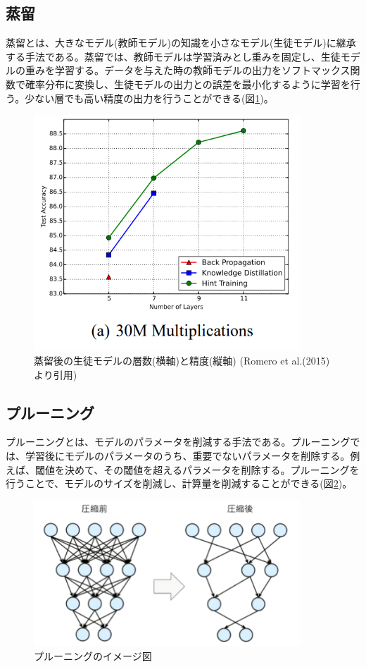 \documentclass{ltjsarticle}
\begin{document}
\subsection{蒸留}
蒸留とは、大きなモデル(教師モデル)の知識を小さなモデル(生徒モデル)に継承する手法である。蒸留では、教師モデルは学習済みとし重みを固定し、生徒モデルの重みを学習する。データを与えた時の教師モデルの出力をソフトマックス関数で確率分布に変換し、生徒モデルの出力との誤差を最小化するように学習を行う。少ない層でも高い精度の出力を行うことができる(図\ref{fig:distillation})。
\begin{figure}[htbp]
  \centering
  \includegraphics[width=10cm]{./capture/distillation.png}
  \caption{蒸留後の生徒モデルの層数(横軸)と精度(縦軸) (Romero et al.(2015) より引用)}
  \label{fig:distillation}
\end{figure}

\subsection{プルーニング}
プルーニングとは、モデルのパラメータを削減する手法である。プルーニングでは、学習後にモデルのパラメータのうち、重要でないパラメータを削除する。例えば、閾値を決めて、その閾値を超えるパラメータを削除する。プルーニングを行うことで、モデルのサイズを削減し、計算量を削減することができる(図\ref{fig:pruning})。
\begin{figure}[htbp]
  \centering
  \includegraphics[width=10cm]{./capture/pruning.png}
  \caption{プルーニングのイメージ図}
  \label{fig:pruning}
\end{figure}
\end{document}
